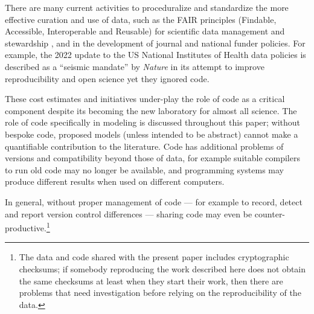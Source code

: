 \documentclass{comjnl}
\begin{document}
There are many current activities to proceduralize and standardize the more effective curation and use of data, such as the FAIR principles (Findable, Accessible, Interoperable and Reusable) for scientific data management and stewardship \cite{fair,fair-principles}, and in the development of journal and national funder policies. For example, the 2022 update to the US National Institutes of Health data policies \cite{nih-policy} is described as a ``seismic mandate'' by \emph{Nature\/} \cite{nih-nature} in its attempt to improve reproducibility and open science yet they ignored code.

These cost estimates and initiatives under-play the role of code as a critical component despite its becoming the new laboratory for almost all science. The role of code specifically in modeling is discussed throughout this paper; without bespoke code, proposed models (unless intended to be abstract) cannot make a quantifiable contribution to the literature. Code has additional problems of versions and compatibility beyond those of data, for example suitable compilers to run old code may no longer be available, and  programming systems may produce different results when used on different computers. 

In general, without proper management of code --- for example to record, detect and report version control differences --- sharing code may even be counter-productive.\footnote{The data and code shared with the present paper includes cryptographic checksums; if somebody reproducing the work described here does not obtain the same checksums at least when they start their work, then there are problems that need investigation before relying on the reproducibility of the data.}
\end{document}
